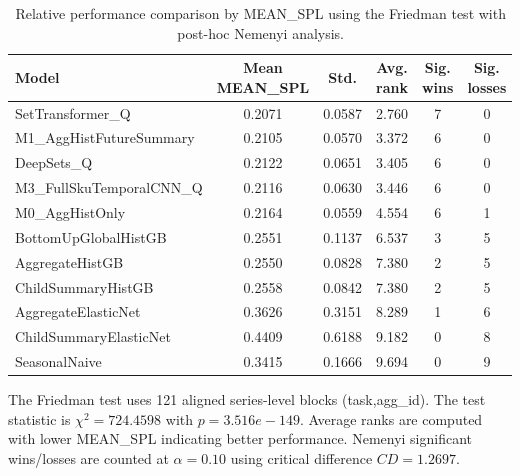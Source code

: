 \begin{table}[H]
\centering
\caption{Relative performance comparison by MEAN_SPL using the Friedman test with post-hoc Nemenyi analysis.}
\label{tab:stats_mean_spl}
\begin{threeparttable}
\begin{tabular}{lccccc}
\toprule
Model & Mean MEAN_SPL & Std. & Avg. rank & Sig. wins & Sig. losses \\
\midrule
SetTransformer\_Q & 0.2071 & 0.0587 & 2.760 & 7 & 0 \\
M1\_AggHistFutureSummary & 0.2105 & 0.0570 & 3.372 & 6 & 0 \\
DeepSets\_Q & 0.2122 & 0.0651 & 3.405 & 6 & 0 \\
M3\_FullSkuTemporalCNN\_Q & 0.2116 & 0.0630 & 3.446 & 6 & 0 \\
M0\_AggHistOnly & 0.2164 & 0.0559 & 4.554 & 6 & 1 \\
BottomUpGlobalHistGB & 0.2551 & 0.1137 & 6.537 & 3 & 5 \\
AggregateHistGB & 0.2550 & 0.0828 & 7.380 & 2 & 5 \\
ChildSummaryHistGB & 0.2558 & 0.0842 & 7.380 & 2 & 5 \\
AggregateElasticNet & 0.3626 & 0.3151 & 8.289 & 1 & 6 \\
ChildSummaryElasticNet & 0.4409 & 0.6188 & 9.182 & 0 & 8 \\
SeasonalNaive & 0.3415 & 0.1666 & 9.694 & 0 & 9 \\
\bottomrule
\end{tabular}
\begin{tablenotes}
\footnotesize \item The Friedman test uses 121 aligned series-level blocks (task,agg\_id). The test statistic is $\chi^2=724.4598$ with $p=3.516e-149$. Average ranks are computed with lower MEAN_SPL indicating better performance. Nemenyi significant wins/losses are counted at $\alpha=0.10$ using critical difference $CD=1.2697$.
\end{tablenotes}
\end{threeparttable}
\end{table}
